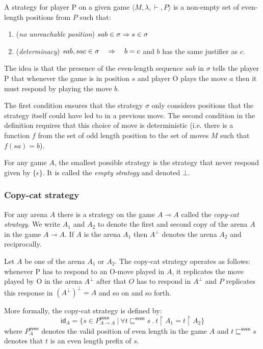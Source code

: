 \begin{dfn}[Strategy]
A strategy for player P on a given game $\langle M, \lambda, \vdash, P \rangle$ is a
non-empty set of even-length positions from $P$ such that:
\begin{enumerate}
\item (\emph{no unreachable position}) $sab \in \sigma \Rightarrow s \in \sigma$
\item (\emph{determinacy}) $sab, sac \in \sigma \quad \Rightarrow \quad  b = c$  and $b$ has the same justifier as
$c$.
\end{enumerate}
\end{dfn}

The idea is that the presence of the even-length sequence $s a b$ in
$\sigma$ tells the player P that whenever the game is in position
$s$ and player O plays the move $a$ then it must respond by playing
the move $b$.

The first condition ensures that the strategy $\sigma$ only
considers positions that the strategy itself could have led to in a
previous move. The second condition in the definition requires that
this choice of move is deterministic (i.e. there is a function $f$
from the set of odd length position to the set of moves $M$ such
that $f(s a) = b$).


For any game $A$, the smallest possible strategy is the strategy
that never respond given by $\{ \epsilon \}$. It is called the
\emph{empty strategy} and denoted $\bot$.

\subsubsection{Copy-cat strategy}

For any arena $A$ there is a strategy on the game $A \multimap A$
called the \emph{copy-cat strategy}. We write $A_1$ and $A_2$ to
denote the first and second copy of the arena $A$ in the game $A
\multimap A$. If $A$ is the arena $A_1$ then $A^\perp$ denotes the
arena $A_2$ and reciprocally.

Let $A$ be one of the arena $A_1$ or $A_2$. The copy-cat strategy
operates as follows: whenever P has to respond to an O-move played
in $A$, it replicates the move played by O in the arena $A^{\perp}$
after that $O$ has to respond in $A^{\perp}$ and $P$ replicates this
response in $(A^\perp)^\perp = A$ and so on and so forth.


More formally, the copy-cat strategy is defined by:
$$ \textsf{id}_A = \{ s \in P^{\textsf{even}}_{A \multimap A} \ | \ \forall t \sqsubseteq^{\textsf{even}} s\ .\ t \upharpoonright A_1 = t \upharpoonright A_2 \}$$
where $P^{\textsf{even}}_A$ denotes the valid position of even
length in the game $A$ and $t \sqsubseteq^{\textsf{even}} s$ denotes
that $t$ is an even length prefix of $s$.

